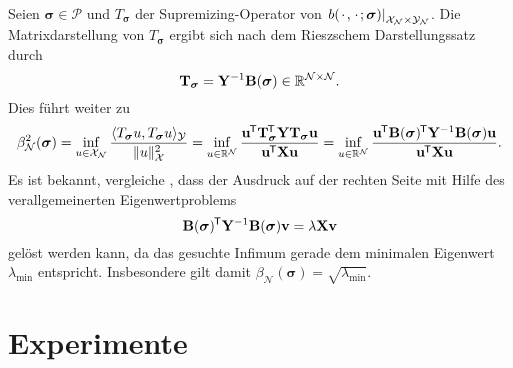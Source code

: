 \documentclass[../main.tex]{subfiles}
\begin{document}
Seien $\bm \sigma \in \mathcal P$ und $T_{\bm \sigma}$ der Supremizing-Operator von $\left.b({\mkern2mu\cdot\mkern2mu}, {\mkern2mu\cdot\mkern2mu}; \bm \sigma)\right|_{\mathcal X_{\mathcal N} \times \mathcal Y_{\mathcal N}}$.
Die Matrixdarstellung von $T_{\bm \sigma}$ ergibt sich nach dem Rieszschem Darstellungssatz durch
\begin{equation}
    \mathbf{T}_{\bm \sigma} = \mathbf{Y}^{-1} \mathbf{B}(\bm \sigma) \in \mathbb{R}^{\mathcal N \times \mathcal N}.
\end{equation}
Dies führt weiter zu
\begin{equation}
    \beta_{\mathcal N}^{2}(\bm \sigma)
    = \inf_{u \in \mathcal X_{\mathcal N}} \frac{\langle T_{\bm \sigma} u,T_{\bm \sigma} u\rangle_{\mathcal Y}}{\lVert u\rVert_{\mathcal X}^{2}}
    = \inf_{u \in \mathbb{R}^{\mathcal N}} \frac{\mathbf{u}^{\mkern-1.5mu\mathsf{T}} \mathbf{T}_{\bm \sigma}^{\mkern-1.5mu\mathsf{T}} \mathbf{Y} \mathbf{T}_{\bm \sigma} \mathbf{u}}{\mathbf{u}^{\mkern-1.5mu\mathsf{T}} \mathbf{X} \mathbf{u}}
    = \inf_{u \in \mathbb{R}^{\mathcal N}} \frac{\mathbf{u}^{\mkern-1.5mu\mathsf{T}} \mathbf{B}(\bm \sigma)^{\mkern-1.5mu\mathsf{T}} \mathbf{Y}^{-1} \mathbf{B}(\bm \sigma) \mathbf{u}}{\mathbf{u}^{\mkern-1.5mu\mathsf{T}} \mathbf{X} \mathbf{u}}.
\end{equation}
Es ist bekannt, vergleiche \cite[Subsection 1.3.5]{Patera:2007un}, dass der Ausdruck auf der rechten Seite mit Hilfe des verallgemeinerten Eigenwertproblems
\begin{equation}
    \mathbf{B}(\bm \sigma)^{\mkern-1.5mu\mathsf{T}} \mathbf{Y}^{-1} \mathbf{B}(\bm \sigma) \mathbf{v} = \lambda \mathbf{X} \mathbf{v}
\end{equation}
gelöst werden kann, da das gesuchte Infimum gerade dem minimalen Eigenwert $\lambda_{\min}$ entspricht.
Insbesondere gilt damit $\beta_{\mathcal N}(\bm \sigma) = \sqrt{\lambda_{\min}}$.


\section{Experimente} %
\label{sec:experimente}
\end{document}
